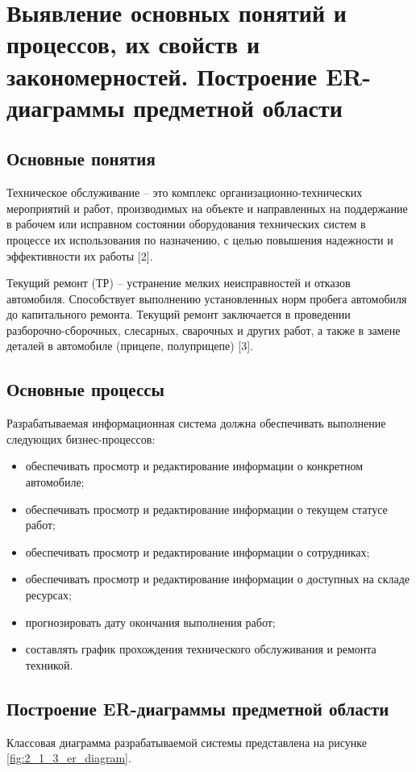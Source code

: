 \documentclass[../nirs.tex]{subfiles}
\begin{document}
\section{Выявление основных понятий и процессов, их свойств и закономерностей.
Построение ER-диаграммы предметной области}

\subsection{Основные понятия}
Техническое обслуживание -- это комплекс организационно-технических мероприятий
и работ, производимых на объекте и направленных на поддержание в рабочем или
исправном состоянии оборудования технических систем в процессе их использования
по назначению, с целью повышения надежности и эффективности их работы [2].

Текущий ремонт (ТР) -- устранение мелких неисправностей и отказов автомобиля.
Способствует выполнению установленных норм пробега автомобиля до капитального
ремонта. Текущий ремонт заключается в проведении разборочно-сборочных,
слесарных, сварочных и других работ, а также в замене деталей в автомобиле
(прицепе, полуприцепе) [3].

\subsection{Основные процессы}
Разрабатываемая информационная система должна обеспечивать выполнение следующих
бизнес-процессов:
\begin{itemize}
	\item обеспечивать просмотр и редактирование информации о конкретном автомобиле;
	\item обеспечивать просмотр и редактирование информации о текущем статусе
		работ;
	\item обеспечивать просмотр и редактирование информации о сотрудниках;
	\item обеспечивать просмотр и редактирование информации о доступных на
		складе ресурсах;
	\item прогнозировать дату окончания выполнения работ;
	\item составлять график прохождения технического обслуживания и ремонта
		техникой.
\end{itemize}

\subsection{Построение ER-диаграммы предметной области}
Классовая диаграмма разрабатываемой системы представлена на рисунке
\ref{fig:2_1_3_er_diagram}.
\end{document}
